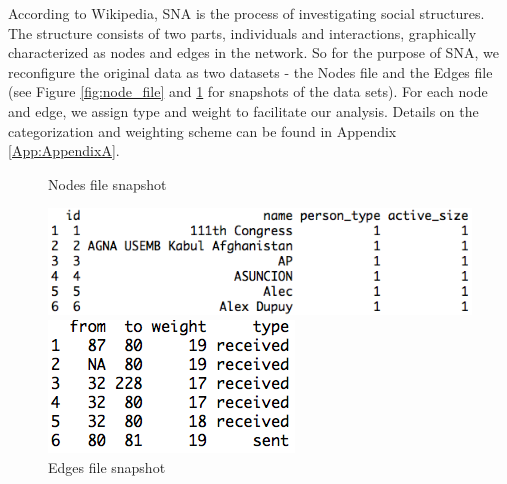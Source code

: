 
According to Wikipedia, SNA  is the process of investigating social structures\cite{wiki_sna}. The structure consists of two parts, individuals and interactions, graphically characterized as nodes and edges in the network. So for the purpose of SNA, we reconfigure the original data as two datasets - the Nodes file and the Edges file (see Figure \ref{fig:node_file} and \ref{fig:edge_file} for snapshots of the data sets). For each node and edge, we assign type and weight to facilitate our analysis. Details on the categorization and weighting scheme can be found in Appendix \ref{App:AppendixA}.
\begin{figure}[ht]
\caption{Nodes file snapshot}
\label{fig:node_file}
\centering
\includegraphics[width=.68\textwidth]{zoe/report_node_file}

\caption{Edges file snapshot}
\label{fig:edge_file}
\centering
\includegraphics[width=.35\textwidth]{zoe/report_edge_file}
\end{figure}
